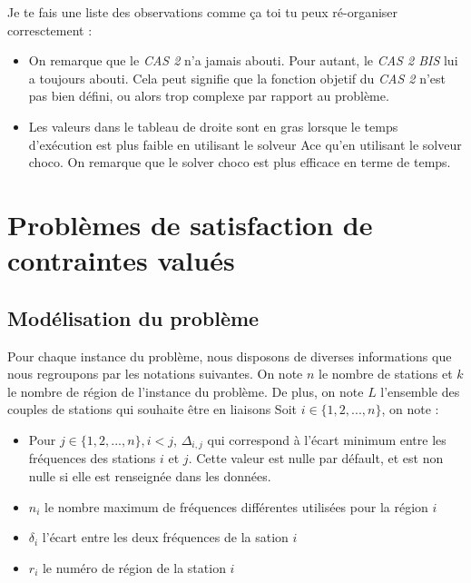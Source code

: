 \documentclass[a4paper, 10pt]{article}
\begin{document}
     Je te fais une liste des observations comme ça toi tu peux ré-organiser corresctement :
     \begin{itemize}
       \item On remarque que le \textit{CAS 2} n'a jamais abouti. Pour autant, le \textit{CAS 2 BIS} lui a toujours abouti. Cela peut signifie que la fonction objetif du \textit{CAS 2} n'est pas bien défini, ou alors trop complexe par rapport au problème.
       \item Les valeurs dans le tableau de droite sont en gras lorsque le temps d'exécution est plus faible en utilisant le solveur Ace qu'en utilisant le solveur choco. On remarque que le solver choco est plus efficace en terme de temps.
     \end{itemize}



  \section{Problèmes de satisfaction de contraintes valués}

  \subsection{Modélisation du problème}

    Pour chaque instance du problème, nous disposons de diverses informations que nous regroupons par les notations suivantes.
    On note $n$ le nombre de stations et $k$ le nombre de région de l'instance du problème. De plus, on note $L$ l'ensemble des couples de stations qui souhaite être en liaisons
    Soit $i \in \{1,2,...,n \}$, on note :
    \begin{itemize}
      \item Pour $ j \in \{1,2,...,n \}, i<j$, $\Delta_{i,j}$ qui correspond à l'écart minimum entre les fréquences des stations $i$ et $j$. Cette valeur est nulle par défault, et est non nulle si elle est renseignée dans les données.
      \item $n_{i}$ le nombre maximum de fréquences différentes utilisées pour la région $i$
      \item $\delta_{i}$ l'écart entre les deux fréquences de la sation $i$
      \item $r_{i}$ le numéro de région de la station $i$
    \end{itemize}
\end{document}
